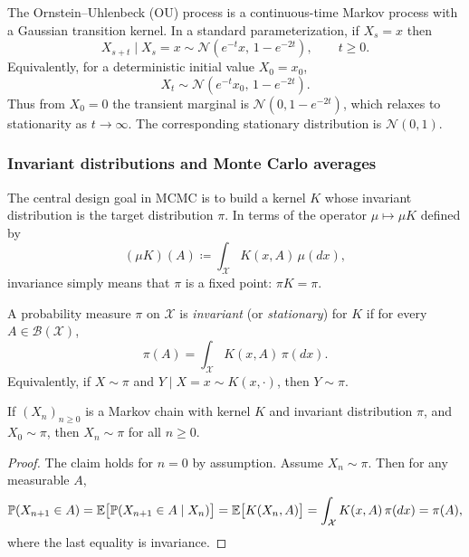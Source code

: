\begin{example}
The Ornstein--Uhlenbeck (OU) process is a continuous-time Markov process with a Gaussian transition kernel.
In a standard parameterization, if $X_s=x$ then
\[
X_{s+t}\mid X_s=x \sim \mathcal{N}\!\left(e^{-t}x,\,1-e^{-2t}\right),
\qquad t\ge 0.
\]
Equivalently, for a deterministic initial value \(X_0=x_0\),
\[
  X_t \sim \mathcal{N}\!\left(e^{-t}x_0,\,1-e^{-2t}\right).
\]
Thus from \(X_0=0\) the transient marginal is \(\mathcal{N}(0,1-e^{-2t})\), which relaxes to stationarity as \(t\to\infty\).
The corresponding stationary distribution is $\mathcal{N}(0,1)$.
\end{example}

\subsubsection{Invariant distributions and Monte Carlo averages}
\label{subsec:invariant-stationary}

The central design goal in MCMC is to build a kernel $K$ whose invariant distribution is the target distribution $\pi$.
In terms of the operator $\mu\mapsto \mu K$ defined by
\[
(\mu K)(A)\coloneqq \int_{\mathcal{X}} K(x,A)\,\mu(dx),
\]
invariance simply means that $\pi$ is a fixed point: $\pi K=\pi$.

\begin{definition}
\label{def:invariant-distribution}
A probability measure $\pi$ on $\mathcal{X}$ is \emph{invariant} (or \emph{stationary}) for $K$ if for every $A\in\mathcal{B}(\mathcal{X})$,
\[
\pi(A) = \int_{\mathcal{X}} K(x,A)\,\pi(dx).
\]
Equivalently, if $X\sim \pi$ and $Y\mid X=x \sim K(x,\cdot)$, then $Y\sim \pi$.
\end{definition}

\begin{proposition}
\label{prop:stationarity}
If $(X_n)_{n\ge 0}$ is a Markov chain with kernel $K$ and invariant distribution $\pi$, and $X_0\sim\pi$, then $X_n\sim\pi$ for all $n\ge 0$.
\end{proposition}
\begin{proof}
The claim holds for $n=0$ by assumption.
Assume $X_n\sim\pi$.
Then for any measurable $A$,
\[
\mathbb{P}(X_{n+1}\in A)
= \mathbb{E}\bigl[\mathbb{P}(X_{n+1}\in A\mid X_n)\bigr]
= \mathbb{E}\bigl[K(X_n,A)\bigr]
= \int_{\mathcal{X}} K(x,A)\,\pi(dx)
= \pi(A),
\]
where the last equality is invariance.
\end{proof}

